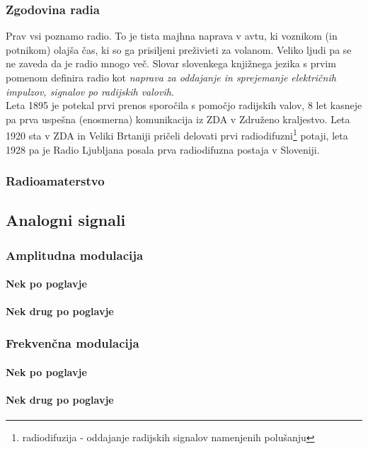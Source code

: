 \documentclass[12pt]{article}
\begin{document}
        \subsubsection{Zgodovina radia}
            Prav vsi poznamo radio. To je tista majhna naprava v avtu, ki voznikom (in potnikom) olajša čas, ki so ga prisiljeni preživieti za volanom. 
            Veliko ljudi pa se ne zaveda da je radio mnogo več. Slovar slovenkega knjižnega jezika s prvim pomenom definira radio kot \textit{naprava za oddajanje in sprejemanje električnih impulzov, signalov po radijskih valovih}. \cite{SSKJ-radio}\\
            Leta 1895 \cite{ppt} je potekal prvi prenos sporočila s pomočjo radijskih valov, 8 let kasneje pa prva uspešna (enosmerna) komunikacija iz ZDA v Združeno kraljestvo. 
            Leta 1920 sta v ZDA in Veliki Brtaniji pričeli delovati prvi radiodifuzni\footnote{radiodifuzija - oddajanje radijskih signalov namenjenih polušanju} potaji, leta 1928 pa je Radio Ljubljana posala prva radiodifuzna postaja v Sloveniji.
        \subsubsection{Radioamaterstvo}
    \subsection{Analogni signali}
        \subsubsection{Amplitudna modulacija}
            \paragraph{Nek po poglavje}
            \paragraph{Nek drug po poglavje}
        \subsubsection{Frekvenčna modulacija}
            \paragraph{Nek po poglavje}
            \paragraph{Nek drug po poglavje}
\end{document}
